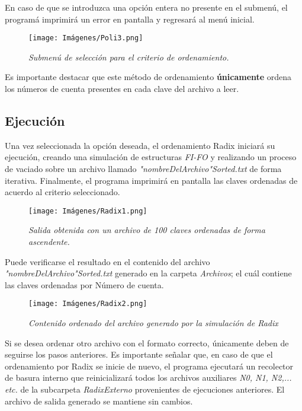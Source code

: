 \documentclass[letterpaper,12pt]{extarticle}
\begin{document}
En caso de que se introduzca una opción entera no presente en el submenú, el programá imprimirá un error en pantalla y regresará al menú inicial.

\begin{figure}[h!]
\centering
\texttt{[image: Imágenes/Poli3.png]}
\caption{\textit{Submenú de selección para el criterio de ordenamiento.}}
\label{fig:Poli3}
\end{figure}

Es importante destacar que este método de ordenamiento \textbf{únicamente} ordena los números de cuenta presentes en cada clave del archivo a leer.

\subsection{Ejecución}

\noindent Una vez seleccionada la opción deseada, el ordenamiento Radix iniciará su ejecución, creando una simulación de estructuras \textit{FI-FO} y realizando un proceso de vaciado sobre un archivo llamado \textit{"nombreDelArchivo"Sorted.txt} de forma iterativa. Finalmente, el programa imprimirá en pantalla las claves ordenadas de acuerdo al criterio seleccionado.

\begin{figure}[h!]
\centering
\texttt{[image: Imágenes/Radix1.png]}
\caption{\textit{Salida obtenida con un archivo de 100 claves ordenadas de forma ascendente.}}
\label{fig:Radix1}
\end{figure}

Puede verificarse el resultado en el contenido del archivo \textit{"nombreDelArchivo"Sorted.txt} generado en la carpeta \textit{Archivos}; el cuál contiene las claves ordenadas por Número de cuenta. 

\begin{figure}[h!]
\centering
\texttt{[image: Imágenes/Radix2.png]}
\caption{\textit{Contenido ordenado del archivo generado por la simulación de Radix}}
\label{fig:Radix2}
\end{figure}

Si se desea ordenar otro archivo con el formato correcto, únicamente deben de seguirse los pasos anteriores. Es importante señalar que, en caso de que el ordenamiento por Radix se inicie de nuevo, el programa ejecutará un recolector de basura interno que reinicializará todos los archivos auxiliares \textit{N0, N1, N2,... etc.} de la subcarpeta \textit{RadixExterno} provenientes de ejecuciones anteriores. El archivo de salida generado se mantiene sin cambios. 
\end{document}
